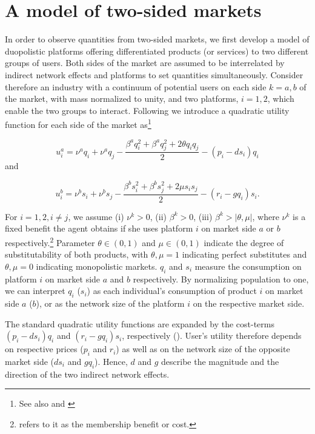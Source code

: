 \documentclass[12pt,a4paper,notitlepage]{article}
\begin{document}
\section{A model of two-sided markets}\label{model}
In order to observe quantities from two-sided markets, we first develop a model of duopolistic platforms offering differentiated products (or services) to two different groups of users. Both sides of the market are assumed to be interrelated by indirect network effects and platforms to set quantities simultaneously. Consider therefore an industry with a continuum of potential users on each side $k = a,b$ of the market, with mass normalized to unity, and two platforms, $i = 1,2$, which enable the two groups to interact. Following \cite{shubik_market_1980} we introduce a quadratic utility function for each side of the market as\footnote{See also \cite{dixit_model_1979} and \cite{kind_competition_2006}}

\begin{equation}\label{4.1}
u_i^a = \nu^a q_i + \nu^a q_j-\frac{\beta^a q^2_i+ \beta^a q^2_j+ 2 \theta q_i q_j}{2}-(p_i-d s_i)q_i
\end{equation} and 

\begin{equation}\label{4.2}
u_i^b = \nu^b s_i + \nu^b s_j -\frac{\beta^b s^2_i+ \beta^b s^2_j+2 \mu s_i s_j}{2}-(r_i-g q_i)s_i.
\end{equation}

For $i=1,2, i \neq j$, we assume (i) $\nu^k > 0$, (ii) $\beta^k > 0$, (iii) $\beta^k>\vert\theta,\mu\vert$, where $\nu^k$ is a fixed benefit the agent obtains if she uses platform $i$ on market side $a$ or $b$ respectively.\footnote{\cite{weyl_price_2010} refers to it as the membership benefit or cost.} Parameter $\theta \in (0,1)$ and $\mu \in (0,1)$ indicate the degree of substitutability of both products, with $\theta, \mu = 1$ indicating perfect substitutes and $\theta,\mu = 0$ indicating monopolistic markets. $q_i$ and $s_i$ measure the consumption on platform $i$ on market side $a$ and $b$ respectively. By normalizing  population to one, we can interpret $q_i$ ($s_i$) as each individual’s consumption of product $i$ on market side $a$ ($b$), or as the network size of the platform $i$ on the respective market side.

The standard quadratic utility functions are expanded by the cost-terms $(p_i-d s_i)q_i$ and $(r_i-g q_i)s_i$, respectively (\cite{kind_business_2009}). User's utility therefore depends on respective prices ($p_i$ and $r_i$) as well as on the network size of the opposite market side ($ds_i$ and $gq_i$). Hence, $d$ and $g$ describe the magnitude and the direction of the two indirect network effects. 
\end{document}

